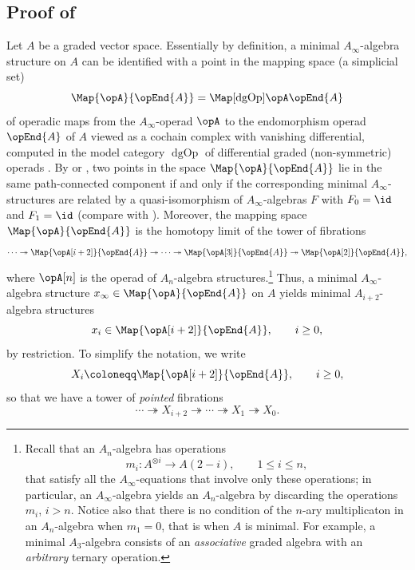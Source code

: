 \documentclass[a4paper]{amsart}
\begin{document}
\subsection{Proof of }
\label{subsec:secondary_formality}

Let $A$ be a graded vector space. Essentially by definition, a minimal
$A_\infty$-algebra structure on $A$ can be identified with a point in the
mapping space (a simplicial set)
\[
  \Map{\opA}{\opEnd{A}}=\Map[\operatorname{dgOp}]{\opA}{\opEnd{A}}
\]
of operadic maps from the $A_\infty$-operad $\opA$ to the endomorphism operad
$\opEnd{A}$ of $A$ viewed as a cochain complex with vanishing differential,
computed in the model category $\operatorname{dgOp}$ of differential graded
(non-symmetric) operads
\cite{lyubashenko_2011_homotopy_unital_algebras,muro_2011_homotopy_theory_nonsymmetric}.
By \cite[Thm.~5.2.1]{Fre09} or \cite[Cor.~2.3]{Mur16},
two points in the space $\Map{\opA}{\opEnd{A}}$ lie in the same path-connected
component if and only if the corresponding minimal $A_\infty$-structures are related by
a quasi-isomorphism of $A_\infty$-algebras $F$ with $F_0=\id$ and $F_1=\id$
(compare with ). Moreover, the mapping space
$\Map{\opA}{\opEnd{A}}$ is the homotopy limit of the tower of fibrations
\[
  \cdots\twoheadrightarrow\Map{\opA[i+2]}{\opEnd{A}}\twoheadrightarrow\cdots\twoheadrightarrow\Map{\opA[3]}{\opEnd{A}}\twoheadrightarrow\Map{\opA[2]}{\opEnd{A}},
\]
where $\opA[n]$ is the operad of $A_n$-algebra structures.\footnote{Recall that
  an $A_n$-algebra has operations
  \[
    m_i\colon A^{\otimes i}\longrightarrow A(2-i),\qquad 1\leq i\leq n,
  \]
  that satisfy all the $A_\infty$-equations that involve only these operations;
  in particular, an $A_\infty$-algebra yields an $A_n$-algebra by discarding the
  operations $m_i$, $i>n$. Notice also that there is no condition of the $n$-ary
  multiplicaton in an $A_n$-algebra when $m_1=0$, that is when $A$ is minimal.
  For example, a minimal $A_3$-algebra consists of an \emph{associative} graded
  algebra with an \emph{arbitrary} ternary operation.}
Thus, a minimal $A_\infty$-algebra structure $x_\infty\in\Map{\opA}{\opEnd{A}}$
on $A$ yields minimal $A_{i+2}$-algebra structures
\[
  x_{i}\in\Map{\opA[i+2]}{\opEnd{A}},\qquad i\geq0,
\]
by restriction. To simplify the notation, we write
\[
  X_i\coloneqq\Map{\opA[i+2]}{\opEnd{A}},\qquad i\geq0,
\]
so that we have a tower of \emph{pointed} fibrations
\[
  \cdots\twoheadrightarrow X_{i+2}\twoheadrightarrow\cdots\twoheadrightarrow
  X_1\twoheadrightarrow X_0.
\]
\end{document}
